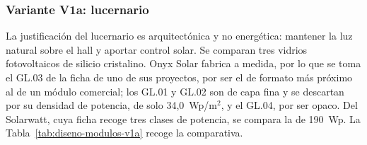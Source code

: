 \subsubsection{Variante V1a: lucernario}
\label{subsubsec:diseno-modulo-v1a}

La justificación del lucernario es arquitectónica y no energética: mantener la luz natural sobre el hall y aportar control solar. Se comparan tres vidrios fotovoltaicos de silicio cristalino. Onyx Solar fabrica a medida, por lo que se toma el GL.03 de la ficha de uno de sus proyectos, por ser el de formato más próximo al de un módulo comercial; los GL.01 y GL.02 son de capa fina y se descartan por su densidad de potencia, de solo 34,0~Wp/m$^2$, y el GL.04, por ser opaco. Del Solarwatt, cuya ficha recoge tres clases de potencia, se compara la de 190~Wp. La Tabla~\ref{tab:diseno-modulos-v1a} recoge la comparativa.

